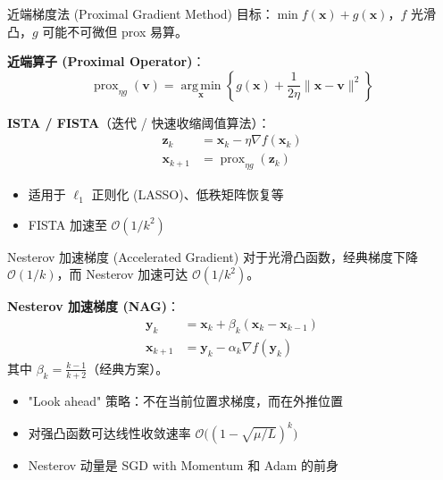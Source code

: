 \documentclass[11pt, aspectratio=169, svgnames, table, fontset=fandol]{ctexbeamer}
\newcommand{\argmin}{\operatorname*{arg\,min}}
\newcommand{\prox}{\operatorname{prox}}
\begin{document}
\begin{frame}{近端梯度法 (Proximal Gradient Method)}
  目标：$\min f(\bm{x}) + g(\bm{x})$，$f$ 光滑凸，$g$ 可能不可微但 prox 易算。

  \vspace{4pt}
  \textbf{近端算子 (Proximal Operator)}：
  \begin{equation*}
    \prox_{\eta g}(\bm{v}) = \argmin_{\bm{x}} \left\{ g(\bm{x}) + \frac{1}{2\eta}\|\bm{x} - \bm{v}\|^2 \right\}
  \end{equation*}

  \vspace{4pt}
  \textbf{ISTA / FISTA}（迭代 / 快速收缩阈值算法）：
  \begin{align*}
    \bm{z}_k &= \bm{x}_k - \eta \nabla f(\bm{x}_k) \\
    \bm{x}_{k+1} &= \prox_{\eta g}(\bm{z}_k)
  \end{align*}

  \begin{itemize}
    \item 适用于 $\ell_1$ 正则化 (LASSO)、低秩矩阵恢复等
    \item FISTA 加速至 $\mathcal{O}(1/k^2)$
  \end{itemize}
\end{frame}

\begin{frame}{Nesterov 加速梯度 (Accelerated Gradient)}
  对于光滑凸函数，经典梯度下降 $\mathcal{O}(1/k)$，而 Nesterov 加速可达 $\mathcal{O}(1/k^2)$。

  \vspace{4pt}
  \textbf{Nesterov 加速梯度 (NAG)}：
  \begin{align*}
    \bm{y}_k &= \bm{x}_k + \beta_k(\bm{x}_k - \bm{x}_{k-1}) \\
    \bm{x}_{k+1} &= \bm{y}_k - \alpha_k \nabla f(\bm{y}_k)
  \end{align*}
  其中 $\beta_k = \frac{k-1}{k+2}$（经典方案）。

  \begin{itemize}
    \item "Look ahead" 策略：不在当前位置求梯度，而在外推位置
    \item 对强凸函数可达线性收敛速率 $\mathcal{O}\big((1 - \sqrt{\mu/L})^k\big)$
    \item Nesterov 动量是 SGD with Momentum 和 Adam 的前身
  \end{itemize}
\end{frame}
\end{document}

